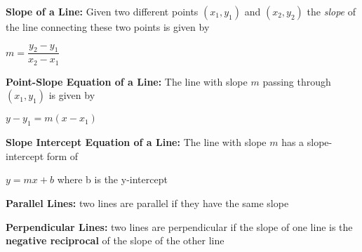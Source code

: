 \documentclass[12pt]{article}
\begin{document}
\textbf{Slope of a Line: } Given two different points $(x_{1},y_{1})$ and $(x_{2}, y_{2})$ the \textit{slope} of the line connecting these two points is given by
\newline

\centerline{$m = \dfrac{y_{2} - y_{1}}{x_{2}-x_{1}}$}
\vspace{.5cm}

\textbf{Point-Slope Equation of a Line:} The line with slope $m$ passing through $(x_{1}, y_{1})$ is given by
\newline

\centerline{$y - y_{1} = m(x-x_{1})$}
\vspace{.5cm}

\textbf{Slope Intercept Equation of a Line:} The line with slope $m$ has a slope-intercept form of 
\newline

\centerline{$y = mx+b$ \hspace{1cm} where b is the y-intercept}

\textbf{Parallel Lines:} two lines are parallel if they have the same slope

\textbf{Perpendicular Lines:} two lines are perpendicular if the slope of one line is the \textbf{negative reciprocal} of the slope of the other line
\end{document}
